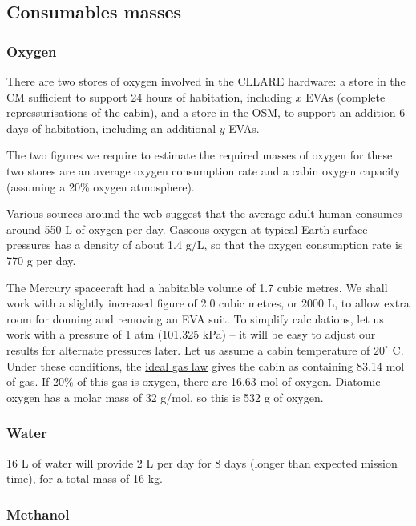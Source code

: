 \documentclass{report}
\begin{document}
\subsection{Consumables masses}

\subsubsection{Oxygen}

There are two stores of oxygen involved in the CLLARE hardware: a store in the CM sufficient to support 24 hours of habitation, including $x$ EVAs (complete repressurisations of the cabin), and a store in the OSM, to support an addition 6 days of habitation, including an additional $y$ EVAs.

The two figures we require to estimate the required masses of oxygen for these two stores are an average oxygen consumption rate and a cabin oxygen capacity (assuming a 20\% oxygen atmosphere).

Various sources around the web suggest that the average adult human consumes around 550 L of oxygen per day.  Gaseous oxygen at typical Earth surface pressures has a density of about 1.4 g/L, so that the oxygen consumption rate is 770 g per day. 

The Mercury spacecraft had a habitable volume of 1.7 cubic metres.  We shall work with a slightly increased figure of 2.0 cubic metres, or 2000 L, to allow extra room for donning and removing an EVA suit.  To simplify calculations, let us work with a pressure of 1 atm (101.325 kPa) -- it will be easy to adjust our results for alternate pressures later.  Let us assume a cabin temperature of $20^\circ$ C.  Under these conditions, the \href{http://en.wikipedia.org/wiki/Ideal_gas_law}{ideal gas law} gives the cabin as containing 83.14 mol of gas.  If 20\% of this gas is oxygen, there are 16.63 mol of oxygen.  Diatomic oxygen has a molar mass of 32 g/mol, so this is 532 g of oxygen.

\subsubsection{Water}

16 L of water will provide 2 L per day for 8 days (longer than expected mission time), for a total mass of 16 kg.

\subsubsection{Methanol}
\end{document}
